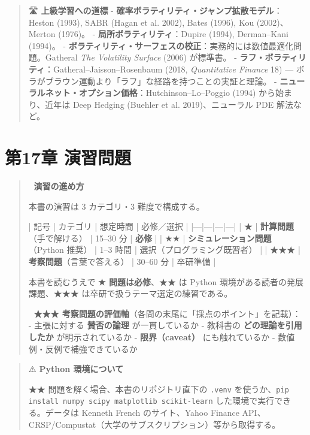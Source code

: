 \documentclass[11pt,a4paper]{report}
\begin{document}
\begin{quote}
🛣 \textbf{上級学習への道標}
- \textbf{確率ボラティリティ・ジャンプ拡散モデル}：Heston (1993), SABR (Hagan et al. 2002), Bates (1996), Kou (2002)、Merton (1976)。
- \textbf{局所ボラティリティ}：Dupire (1994), Derman–Kani (1994)。
- \textbf{ボラティリティ・サーフェスの校正}：実務的には数値最適化問題。Gatheral \emph{The Volatility Surface} (2006) が標準書。
- \textbf{ラフ・ボラティリティ}：Gatheral–Jaisson–Rosenbaum (2018, \emph{Quantitative Finance} 18) — ボラがブラウン運動より「ラフ」な経路を持つことの実証と理論。
- \textbf{ニューラルネット・オプション価格}：Hutchinson–Lo–Poggio (1994) から始まり、近年は Deep Hedging (Buehler et al. 2019)、ニューラル PDE 解法など。
\end{quote}

\noindent\hrulefill

\chapter{第17章 演習問題}

\begin{quote}
🎯 \textbf{演習の進め方}

本書の演習は 3 カテゴリ・3 難度で構成する。

| 記号 | カテゴリ | 想定時間 | 必修／選択 |
|---|---|---|---|
| ★ | \textbf{計算問題}（手で解ける） | 15–30 分 | \textbf{必修} |
| ★★ | \textbf{シミュレーション問題}（Python 推奨） | 1–3 時間 | 選択（プログラミング既習者） |
| ★★★ | \textbf{考察問題}（言葉で答える） | 30–60 分 | 卒研準備 |

本書を読むうえで \textbf{★ 問題は必修}、★★ は Python 環境がある読者の発展課題、★★★ は卒研で扱うテーマ選定の練習である。

📝 \textbf{★★★ 考察問題の評価軸}（各問の末尾に「採点のポイント」を記載）：
- 主張に対する \textbf{賛否の論理} が一貫しているか
- 教科書の \textbf{どの理論を引用したか} が明示されているか
- \textbf{限界（caveat）} にも触れているか
- 数値例・反例で補強できているか
\end{quote}

\begin{quote}
⚠️ \textbf{Python 環境について}

★★ 問題を解く場合、本書のリポジトリ直下の \texttt{.venv} を使うか、\texttt{pip install numpy scipy matplotlib scikit-learn} した環境で実行できる。データは Kenneth French のサイト、Yahoo Finance API、CRSP/Compustat（大学のサブスクリプション）等から取得する。
\end{quote}
\end{document}
